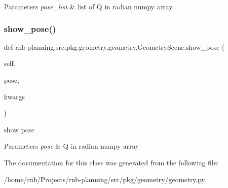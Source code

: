 \begin{DoxyParams}{Parameters}
{\em pose\+\_\+list} & list of Q in radian numpy array \\
\hline
\end{DoxyParams}
\mbox{\label{classrnb-planning_1_1src_1_1pkg_1_1geometry_1_1geometry_1_1_geometry_scene_ac826402b53bcfa3d5adbe3bb888e109a}} 
\subsubsection{\texorpdfstring{show\+\_\+pose()}{show\_pose()}}
{\footnotesize\ttfamily def rnb-\/planning.\+src.\+pkg.\+geometry.\+geometry.\+Geometry\+Scene.\+show\+\_\+pose (\begin{DoxyParamCaption}\item[{}]{self,  }\item[{}]{pose,  }\item[{}]{kwargs }\end{DoxyParamCaption})}



show pose 


\begin{DoxyParams}{Parameters}
{\em pose} & Q in radian numpy array \\
\hline
\end{DoxyParams}


The documentation for this class was generated from the following file\+:\begin{DoxyCompactItemize}
\item 
/home/rnb/\+Projects/rnb-\/planning/src/pkg/geometry/geometry.\+py\end{DoxyCompactItemize}
